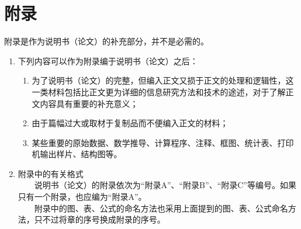 
\chapter{附录}
\label{chap:appendix}

附录是作为说明书（论文）的补充部分，并不是必需的。
\begin{enumerate}
\item{}下列内容可以作为附录编于说明书（论文）之后：
\begin{enumerate} \item{}为了说明书（论文）的完整，但编入正文又损于正文的处理和逻辑性，这一类材料包括比正文更为详细的信息研究方法和技术的途述，对于了解正文内容具有重要的补充意义；
\item{}由于篇幅过大或取材于复制品而不便编入正文的材料；
\item{}某些重要的原始数据、数学推导、计算程序、注释、框图、统计表、打印机输出样片、结构图等。
\end{enumerate}
\item{}
附录中的有关格式\\
　　说明书（论文）的附录依次为“附录A”、“附录B”、“附录C”等编号。如果只有一个附录，也应编为“附录A”。\\
　　附录中的图、表、公式的命名方法也采用上面提到的图、表、公式命名方法，只不过将章的序号换成附录的序号。
\end{enumerate}
